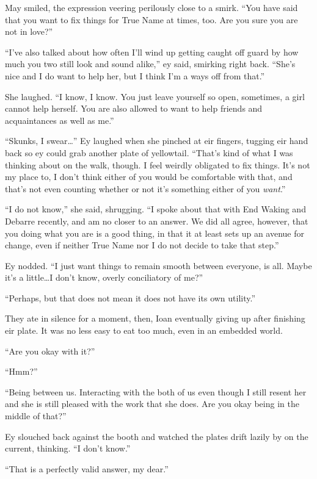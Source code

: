 May smiled, the expression veering perilously close to a smirk. ``You have said that you want to fix things for True Name at times, too. Are you sure you are not in love?''

``I've also talked about how often I'll wind up getting caught off guard by how much you two still look and sound alike,'' ey said, smirking right back. ``She's nice and I do want to help her, but I think I'm a ways off from that.''

She laughed. ``I know, I know. You just leave yourself so open, sometimes, a girl cannot help herself. You are also allowed to want to help friends and acquaintances as well as me.''

``Skunks, I swear\ldots{}'' Ey laughed when she pinched at eir fingers, tugging eir hand back so ey could grab another plate of yellowtail. ``That's kind of what I was thinking about on the walk, though. I feel weirdly obligated to fix things. It's not my place to, I don't think either of you would be comfortable with that, and that's not even counting whether or not it's something either of you \emph{want}.''

``I do not know,'' she said, shrugging. ``I spoke about that with End Waking and Debarre recently, and am no closer to an answer. We did all agree, however, that you doing what you are is a good thing, in that it at least sets up an avenue for change, even if neither True Name nor I do not decide to take that step.''

Ey nodded. ``I just want things to remain smooth between everyone, is all. Maybe it's a little\ldots I don't know, overly conciliatory of me?''

``Perhaps, but that does not mean it does not have its own utility.''

They ate in silence for a moment, then, Ioan eventually giving up after finishing eir plate. It was no less easy to eat too much, even in an embedded world.

``Are you okay with it?''

``Hmm?''

``Being between us. Interacting with the both of us even though I still resent her and she is still pleased with the work that she does. Are you okay being in the middle of that?''

Ey slouched back against the booth and watched the plates drift lazily by on the current, thinking. ``I don't know.''

``That is a perfectly valid answer, my dear.''


